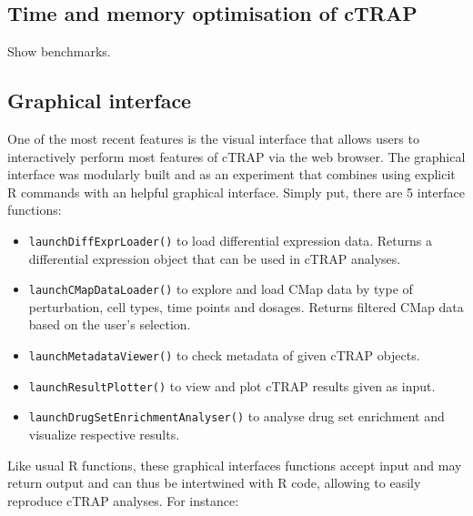 \subsection{Time and memory optimisation of cTRAP}

Show benchmarks.

\subsection{Graphical interface}

One of the most recent features is the visual interface that allows users to interactively perform most features of cTRAP via the web browser. The graphical interface was modularly built and as an experiment that combines using explicit R commands with an helpful graphical interface. Simply put, there are 5 interface functions:

\begin{itemize}
	\item \texttt{launchDiffExprLoader()} to load differential expression data. Returns a differential expression object that can be used in cTRAP analyses.
	\item \texttt{launchCMapDataLoader()} to explore and load CMap data by type of perturbation, cell types, time points and dosages. Returns filtered CMap data based on the user's selection.
	\item \texttt{launchMetadataViewer()} to check metadata of given cTRAP objects.
	\item \texttt{launchResultPlotter()} to view and plot cTRAP results given as input.
	\item \texttt{launchDrugSetEnrichmentAnalyser()} to analyse drug set enrichment and visualize respective results.
\end{itemize}

Like usual R functions, these graphical interfaces functions accept input and may return output and can thus be intertwined with R code, allowing to easily reproduce cTRAP analyses. For instance:

